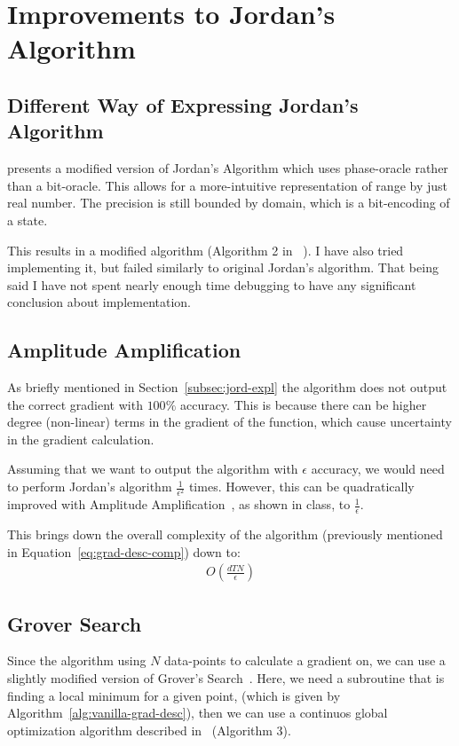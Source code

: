 \documentclass{article}
\begin{document}
\section{Improvements to Jordan's Algorithm}
\label{sec:jor-improv}
\subsection{Different Way of Expressing Jordan's Algorithm}
\cite{Gily_n_2019} presents a modified version of Jordan's Algorithm which uses phase-oracle rather than a bit-oracle.
This allows for a more-intuitive representation of range by just real number. The precision is still bounded by domain,
which is a bit-encoding of a state.

This results in a modified algorithm (Algorithm 2 in ~\cite{Gily_n_2019}). I have also tried implementing it,
but failed similarly to original Jordan's algorithm. That being said I have not spent nearly enough time debugging to have
any significant conclusion about implementation.

\subsection{Amplitude Amplification}
As briefly mentioned in Section~\ref{subsec:jord-expl} the algorithm does not output the correct gradient with $100\%$ accuracy.
This is because there can be higher degree (non-linear) terms in the gradient of the function, which cause uncertainty in the gradient
calculation.

Assuming that we want to output the algorithm with $\epsilon$ accuracy, we would need to perform Jordan's algorithm $\frac{1}{\epsilon^2}$ times.
However, this can be quadratically improved with Amplitude Amplification~\cite{Brassard}, as shown in class, to $\frac{1}{\epsilon}$.

This brings down the overall complexity of the algorithm (previously mentioned in Equation~\ref{eq:grad-desc-comp}) down to:
\begin{align}
    O(\frac{dTN}{\epsilon})
    \label{eq:grad-amp-amp-comp}
\end{align}

\subsection{Grover Search}
Since the algorithm using $N$ data-points to calculate a gradient on, we can use a slightly modified version of Grover's Search~\cite{Grover_1998}.
Here, we need a subroutine that is finding a local minimum for a given point, (which is given by Algorithm~\ref{alg:vanilla-grad-desc}),
then we can use a continuos global optimization algorithm described in~\cite{lara2013new} (Algorithm 3).
\end{document}
